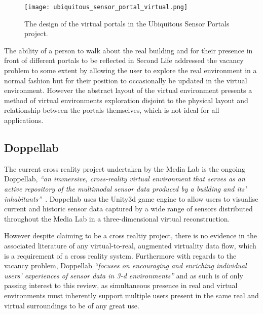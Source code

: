\begin{figure}[h]
\centering
\texttt{[image: ubiquitous\_sensor\_portal\_virtual.png]}
\caption{The design of the virtual portals in the Ubiquitous Sensor Portals project.}
\label{ubiquitous_sensor_portal_virtual.png}
\end{figure}

The ability of a person to walk about the real building and for their presence in front of different portals to be reflected in Second Life addressed the vacancy problem to some extent by allowing the user to explore the real environment in a normal fashion but for their position to occasionally be updated in the virtual environment. However the abstract layout of the virtual environment presents a method of virtual environments exploration disjoint to the physical layout and relationship between the portals themselves, which is not ideal for all applications.

\subsection{Doppellab}
\label{subsec:doppellab}
The current cross reality project undertaken by the Media Lab is the ongoing Doppellab, \textit{``an immersive, cross-reality virtual environment that serves as an active repository of the multimodal sensor data produced by a building and its' inhabitants''}~\cite{Dublon2011, Dublon2011a}. Doppellab uses the Unity3d game engine to allow users to visualise current and historic sensor data captured by a wide range of sensors distributed throughout the Media Lab in a three-dimensional virtual reconstruction.

However despite claiming to be a cross realtiy project, there is no evidence in the associated literature of any virtual-to-real, augmented virtuality data flow, which is a requirement of a cross reality system. Furthermore with regards to the vacancy problem, Doppellab \textit{``focuses on encouraging and enriching individual users' experiences of sensor data in 3-d environments''} and as such is of only passing interest to this review, as simultaneous presence in real and virtual environments must inherently support multiple users present in the same real and virtual surroundings to be of any great use.


